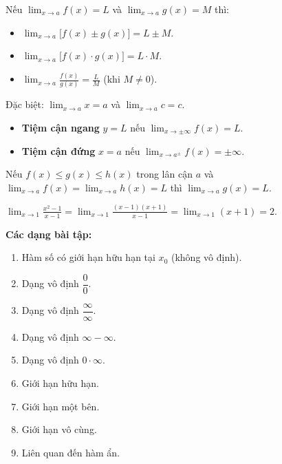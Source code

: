 \documentclass[12pt,a4paper]{article}
\begin{document}
\begin{tinhchat}[title={Quy tắc tính}]
  Nếu $\displaystyle\lim_{x \to a} f(x) = L$ và $\displaystyle\lim_{x \to a} g(x) = M$ thì:
  \begin{itemize}
    \item $\displaystyle\lim_{x \to a}\bigl[f(x) \pm g(x)\bigr] = L \pm M$.
    \item $\displaystyle\lim_{x \to a}\bigl[f(x) \cdot g(x)\bigr] = L \cdot M$.
    \item $\displaystyle\lim_{x \to a}\frac{f(x)}{g(x)} = \frac{L}{M}$ \;(khi $M \ne 0$).
  \end{itemize}
  Đặc biệt: $\displaystyle\lim_{x \to a} x = a$ và $\displaystyle\lim_{x \to a} c = c$.
\end{tinhchat}

\begin{dinhnghia}[title={Tiệm cận}]
  \begin{itemize}
    \item \textbf{Tiệm cận ngang} $y = L$ nếu $\displaystyle\lim_{x \to \pm\infty} f(x) = L$.
    \item \textbf{Tiệm cận đứng} $x = a$ nếu $\displaystyle\lim_{x \to a^{\pm}} f(x) = \pm\infty$.
  \end{itemize}
\end{dinhnghia}

\begin{dinhly}[title={Nguyên lý kẹp (cho hàm số)}]
  Nếu $f(x) \le g(x) \le h(x)$ trong lân cận $a$
  và $\displaystyle\lim_{x \to a} f(x) = \lim_{x \to a} h(x) = L$
  thì $\displaystyle\lim_{x \to a} g(x) = L$.
\end{dinhly}

\begin{vidu}
  $\displaystyle\lim_{x \to 1} \frac{x^2 - 1}{x - 1}
  = \lim_{x \to 1} \frac{(x-1)(x+1)}{x-1}
  = \lim_{x \to 1} (x+1) = 2.$
\end{vidu}

\medskip\noindent\textbf{Các dạng bài tập:}
\begin{enumerate}[label=\textbf{Dạng \arabic*:}, leftmargin=*, align=left]
  \item Hàm số có giới hạn hữu hạn tại $x_0$ (không vô định).
  \item Dạng vô định $\dfrac{0}{0}$.
  \item Dạng vô định $\dfrac{\infty}{\infty}$.
  \item Dạng vô định $\infty - \infty$.
  \item Dạng vô định $0 \cdot \infty$.
  \item Giới hạn hữu hạn.
  \item Giới hạn một bên.
  \item Giới hạn vô cùng.
  \item Liên quan đến hàm ẩn.
\end{enumerate}
\end{document}
